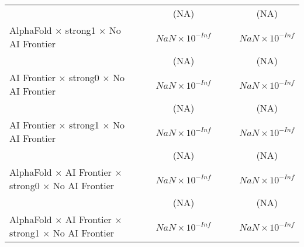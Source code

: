 \begin{tabular}{lcccccc}
                                                                              &                        &                        & (NA)                   &                        &                        & (NA)\\   
   AlphaFold $\times$ strong1 $\times$ No AI Frontier                         &                        &                        & $NaN\times 10^{-Inf}$  &                        &                        & $NaN\times 10^{-Inf}$\\    
                                                                              &                        &                        & (NA)                   &                        &                        & (NA)\\   
   AI Frontier $\times$ strong0 $\times$ No AI Frontier                       &                        &                        & $NaN\times 10^{-Inf}$  &                        &                        & $NaN\times 10^{-Inf}$\\    
                                                                              &                        &                        & (NA)                   &                        &                        & (NA)\\   
   AI Frontier $\times$ strong1 $\times$ No AI Frontier                       &                        &                        & $NaN\times 10^{-Inf}$  &                        &                        & $NaN\times 10^{-Inf}$\\    
                                                                              &                        &                        & (NA)                   &                        &                        & (NA)\\   
   AlphaFold $\times$ AI Frontier $\times$ strong0 $\times$ No AI Frontier    &                        &                        & $NaN\times 10^{-Inf}$  &                        &                        & $NaN\times 10^{-Inf}$\\    
                                                                              &                        &                        & (NA)                   &                        &                        & (NA)\\   
   AlphaFold $\times$ AI Frontier $\times$ strong1 $\times$ No AI Frontier    &                        &                        & $NaN\times 10^{-Inf}$  &                        &                        & $NaN\times 10^{-Inf}$\\    

\end{tabular}
